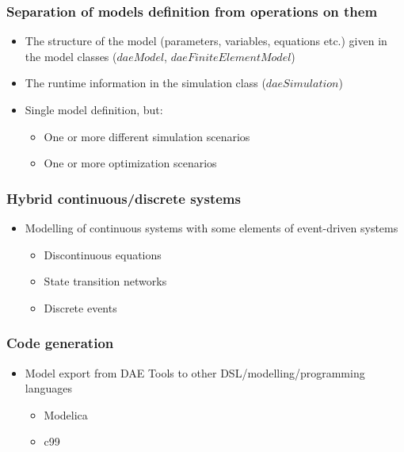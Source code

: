 \documentclass{beamer}
\begin{document}
\begin{frame}
\frametitle{Separation of models definition from operations on them}
\begin{block}{}
\begin{itemize}
  \item The structure of the model (parameters, variables, equations etc.) given in the model classes ($daeModel$, $daeFiniteElementModel$) 
  \item The runtime information in the simulation class ($daeSimulation$)
  \item Single model definition, but:
  \begin{itemize}
    \item One or more different simulation scenarios
    \item One or more optimization scenarios
  \end{itemize}
\end{itemize}
\end{block}
\end{frame}

\begin{frame}
\frametitle{Hybrid continuous/discrete systems}
\begin{block}{}
\begin{itemize}
  \item Modelling of continuous systems with some elements of event-driven systems 
  \begin{itemize}
    \item Discontinuous equations
    \item State transition networks
    \item Discrete events
  \end{itemize}
\end{itemize}
\end{block}
\end{frame}

\begin{frame}
\frametitle{Code generation}
\begin{block}{}
\begin{itemize}
  \item Model export from DAE Tools to other DSL/modelling/programming languages
  \begin{itemize}
    \item Modelica
    \item c99
  \end{itemize}
\end{itemize}
\end{block}
\end{frame}
\end{document}
